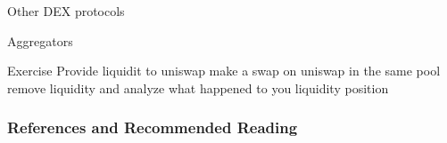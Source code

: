 \documentclass[]{beamer}
\begin{document}
\begin{frame}{Other DEX protocols}

\end{frame}

\begin{frame}{Aggregators}

\end{frame}


\begin{frame}{Exercise}
Provide liquidit to uniswap
make a swap on uniswap in the same pool
remove liquidity and analyze what happened to you liquidity position
\end{frame}



\begin{frame}%
\frametitle{References and Recommended Reading}
	
	
\end{frame}
\end{document}
